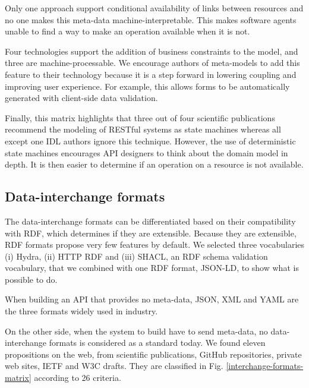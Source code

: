Only one approach \cite{Schreier:2011:MRA:1967428.1967434} support conditional availability of links between resources and no one makes this meta-data machine-interpretable. This makes software agents unable to find a way to make an operation available when it is not.

Four technologies support the addition of business constraints to the model, and three are machine-processable. We encourage authors of meta-models to add this feature to their technology because it is a step forward in lowering coupling and improving user experience. For example, this allows forms to be automatically generated with client-side data validation.

Finally, this matrix highlights that three out of four scientific publications recommend the modeling of RESTful systems as state machines whereas all except one IDL authors ignore this technique. However, the use of deterministic state machines encourages API designers to think about the domain model in depth. It is then easier to determine if an operation on a resource is not available.

\subsection{Data-interchange formats}

The data-interchange formats can be differentiated based on their compatibility with RDF, which determines if they are extensible. Because they are extensible, RDF formats propose very few features by default. We selected three vocabularies (i) Hydra, (ii) HTTP RDF and (iii) SHACL, an RDF schema validation vocabulary, that we combined with one RDF format, JSON-LD, to show what is possible to do.

When building an API that provides no meta-data, JSON, XML and YAML are the three formats widely used in industry.

On the other side, when the system to build have to send meta-data, no data-interchange formats is considered as a standard today. We found eleven propositions on the web, from scientific publications, GitHub repositories, private web sites, IETF and W3C drafts. They are classified in Fig. \ref{interchange-formats-matrix} according to 26 criteria.


